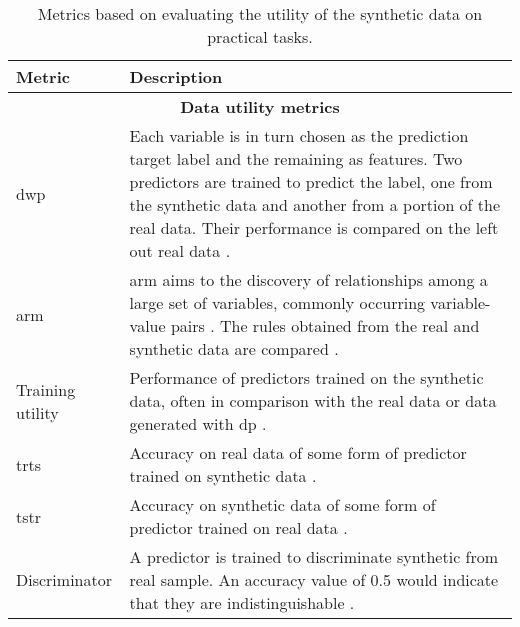 \begin{table}[H]
        \footnotesize
         \setlength{\extrarowheight}{0.5em}
        \caption{Metrics based on evaluating the utility of the synthetic data on practical tasks.}\label{tab:3:augmentation}
        
        \begin{tabularx}{\textwidth}{@{} p{} X @{}} \toprule
        Metric & Description \\ \midrule
        
        \multicolumn{2}{c}{\textbf{Data utility metrics}}\\ \midrule
        
        \gls{dwp} & Each variable is in turn chosen as the prediction target label and the remaining as features. Two predictors are trained to predict the label, one from the synthetic data and another from a portion of the real data. Their performance is compared on the left out real data \cite{Choi2017-nt,Camino2018-re,Goncalves2020,yan2020generating, tanti2019, baowaly_2019_IEEE}.\\
        
        \gls{arm} & \gls{arm} aims to the discovery of relationships among a large set of variables, commonly occurring variable-value pairs \cite{Agrawal1993}. The rules obtained from the real and synthetic data are compared \cite{baowaly_2019_IEEE,baowaly_2019_jamia,BaeAnomiGAN2020,yan2020generating}.\\
        
        Training utility & Performance of predictors trained on the synthetic data, often in comparison with the real data or data generated with \gls{dp} \cite{BaeAnomiGAN2020}.\\
        
        \gls{trts} & Accuracy on real data of some form of predictor trained on synthetic data \cite{Beaulieu-Jones2019-ct, Rankin2020, Yoon2020-anon}. \\ 
        
        \gls{tstr} & Accuracy on synthetic data of some form of predictor trained on real data   \cite{BaeAnomiGAN2020, Yoon2020-anon, Jordon2019}.\\
        
        Discriminator & A predictor is trained to discriminate synthetic from real sample. An accuracy value of 0.5 would indicate that they are indistinguishable \cite{Fisher2019, walsh2020generating, yale:hal-02160496}.\\ 
        

\end{tabularx}
\end{table}
